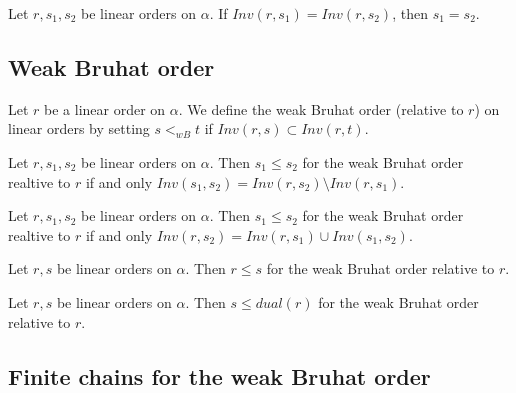 \begin{sublemma}
Let $r,s_1,s_2$ be linear orders on $\alpha$. If $Inv(r,s_1)=Inv(r,s_2)$, then $s_1=s_2$.

\end{sublemma}


\subsection{Weak Bruhat order}

\begin{subdefi}[WeakBruhatOrder]
Let $r$ be a linear order on $\alpha$. We define the weak Bruhat order (relative to $r$) on linear orders by
setting $s<_{wB}t$ if $Inv(r,s)\subset Inv(r,t)$.

\end{subdefi}

\begin{sublemma}
Let $r,s_1,s_2$ be linear orders on $\alpha$. Then $s_1\le s_2$ for the weak Bruhat order realtive to $r$ if and only
$Inv(s_1,s_2)=Inv(r,s_2) \setminus Inv(r,s_1)$.

\end{sublemma}

\begin{sublemma}
Let $r,s_1,s_2$ be linear orders on $\alpha$. Then $s_1\le s_2$ for the weak Bruhat order realtive to $r$ if and only
$Inv(r,s_2)=Inv(r,s_1) \cup Inv(s_1,s_2)$.

\end{sublemma}

\begin{sublemma}
Let $r,s$ be linear orders on $\alpha$. Then $r\le s$ for the weak Bruhat order relative to $r$.

\end{sublemma}

\begin{sublemma}
Let $r,s$ be linear orders on $\alpha$. Then $s\le dual(r)$ for the weak Bruhat order relative to $r$.

\end{sublemma}


\subsection{Finite chains for the weak Bruhat order}

